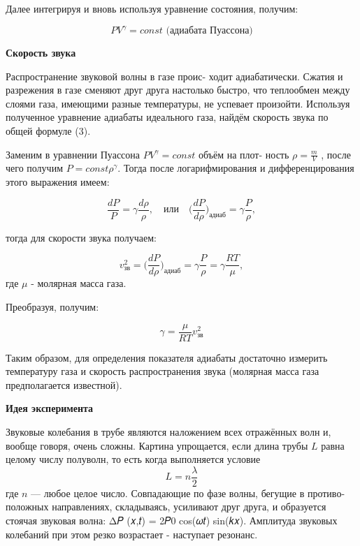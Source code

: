 \documentclass[10pt]{article}
\begin{document}
    Далее интегрируя и вновь используя уравнение состояния, получим:

    \begin{equation}
        PV^{\gamma} = const
        \text{  (адиабата Пуассона)}
    \end{equation}

    \textbf{Скорость звука}

    Распространение звуковой волны в газе проис- ходит адиабатически. Сжатия и разрежения в газе сменяют друг друга настолько быстро, что теплообмен между слоями газа, имеющими разные температуры, не успевает произойти. Используя полученное уравнение адиабаты идеального газа, найдём скорость звука по общей формуле (3).

    Заменим в уравнении Пуассона $PV^{\gamma} = const$ объём на плот- ность $\rho = \frac{m}{V}$ , после чего получим $P = const \rho^{\gamma} $. Тогда после логарифмирования и дифференцирования этого выражения имеем:

    \begin{equation}
        \frac{dP}{P} = \gamma \frac {d\rho}{\rho}, \quad \text{или} \quad \bigg(\frac{dP}{d\rho}\bigg)_\text{адиаб} = \gamma \frac{P}{\rho},
    \end{equation}

    тогда для скорости звука получаем:

    \begin{equation}
        v_\text{зв}^2 = \bigg(\frac{dP}{d\rho}\bigg)_\text{адиаб} = \gamma \frac{P}{\rho} = \gamma \frac{RT}{\mu},
    \end{equation}
    где $\mu$ - молярная масса газа.

    Преобразуя, получим:

    \begin{equation}
        \gamma = \frac{\mu}{RT}v_\text{зв}^2
    \end{equation}

    Таким образом, для определения показателя адиабаты достаточно измерить температуру газа и скорость распространения звука (молярная масса газа предполагается известной).

    \textbf{Идея эксперимента}

    Звуковые колебания в трубе являются наложением всех отражённых волн и, вообще говоря, очень сложны. Картина упрощается, если длина трубы $𝐿$ равна целому числу полуволн, то есть когда выполняется условие
    \begin{equation}
        L = n\frac{\lambda}{2}
    \end{equation}
    где $n$ — любое целое число. Совпадающие по фазе волны, бегущие в противо- положных направлениях, складываясь, усиливают друг друга, и образуется стоячая звуковая волна:
    Δ𝑃 (𝑥,𝑡) = 2𝑃0 cos(𝜔𝑡) sin(𝑘𝑥).
    Амплитуда звуковых колебаний при этом резко возрастает - наступает резонанс.
\end{document}
